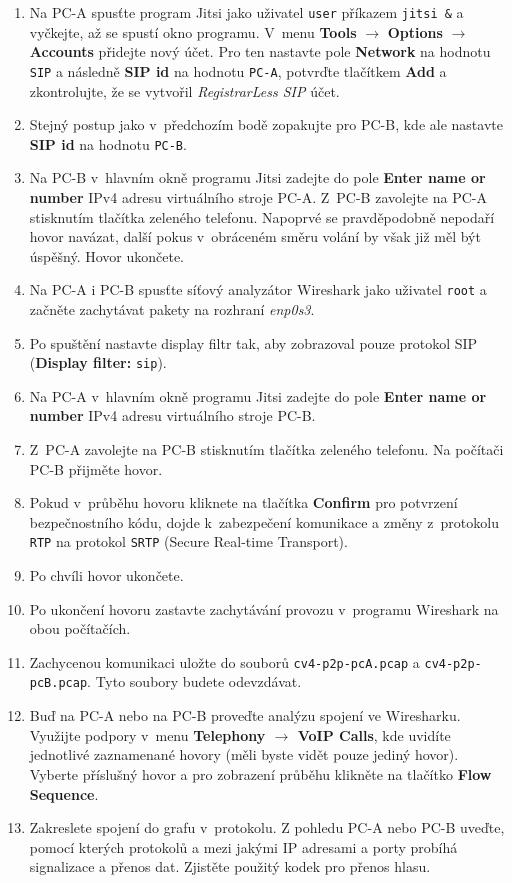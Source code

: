 \begin{enumerate}
    \item Na PC-A spusťte program Jitsi jako uživatel \texttt{user} příkazem \texttt{jitsi \&} a vyčkejte, až se spustí okno programu.
	V~menu {\bf Tools} $\rightarrow$ {\bf Options} $\rightarrow$ {\bf Accounts} přidejte nový účet. Pro ten nastavte pole {\bf Network} na hodnotu {\tt SIP} a následně {\bf SIP id} na hodnotu {\tt PC-A}, potvrďte tlačítkem \textbf{Add} a zkontrolujte, že se vytvořil \emph{RegistrarLess SIP} účet.
    \item Stejný postup jako v~předchozím bodě zopakujte pro PC-B, kde ale nastavte {\bf SIP id} na hodnotu {\tt PC-B}.
	\item Na PC-B v hlavním okně programu Jitsi zadejte do pole {\bf Enter name or number} IPv4 adresu virtuálního stroje PC-A.
	Z~PC-B zavolejte na PC-A stisknutím tlačítka zeleného telefonu. Napoprvé se pravděpodobně nepodaří hovor navázat, další pokus v~obráceném směru volání by však již měl být úspěšný.
	Hovor ukončete.
	\item Na PC-A i PC-B spusťte síťový analyzátor Wireshark jako uživatel \texttt{root} a začněte zachytávat pakety na rozhraní \emph{enp0s3}.
    \item Po spuštění nastavte display filtr tak, aby zobrazoval pouze protokol SIP (\textbf{Display filter:} \texttt{sip}).
    \item Na PC-A v hlavním okně programu Jitsi zadejte do pole {\bf Enter name or number} IPv4 adresu virtuálního stroje PC-B.
    \item Z~PC-A zavolejte na PC-B stisknutím tlačítka zeleného telefonu. Na počítači PC-B přijměte hovor.
	\item Pokud v~průběhu hovoru kliknete na tlačítka \textbf{Confirm} pro potvrzení bezpečnostního kódu, dojde k~zabezpečení komunikace a změny z~protokolu \texttt{RTP} na protokol \texttt{SRTP} (Secure Real-time Transport).
	\item Po chvíli hovor ukončete.
	\item Po ukončení hovoru zastavte zachytávání provozu v~programu Wireshark na obou počítačích.
	\item Zachycenou komunikaci uložte do souborů \texttt{cv4-p2p-pcA.pcap} a \texttt{cv4-p2p-pcB.pcap}. Tyto soubory budete odevzdávat.
    \item Buď na PC-A nebo na PC-B proveďte analýzu spojení ve Wiresharku. Využijte podpory v~menu {\bf Telephony $\rightarrow$ VoIP Calls}, kde uvidíte jednotlivé zaznamenané hovory (měli byste vidět pouze jediný hovor). Vyberte příslušný hovor a pro zobrazení průběhu klikněte na tlačítko {\bf Flow Sequence}.
    \item Zakreslete spojení do grafu v~protokolu. Z pohledu PC-A nebo PC-B uveďte, pomocí kterých protokolů a mezi jakými IP adresami a porty probíhá signalizace a přenos dat. Zjistěte použitý kodek pro přenos hlasu.\\


\end{enumerate}
